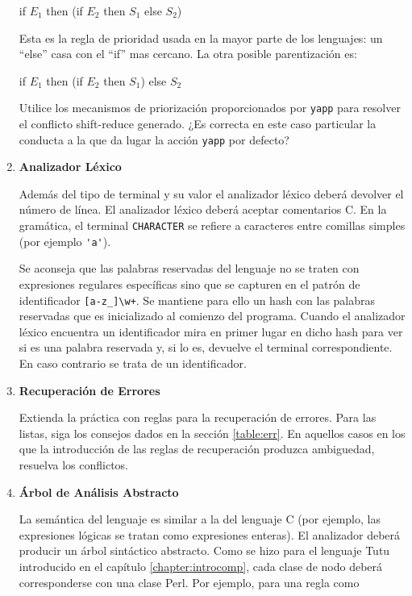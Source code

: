 \begin{enumerate}
\begin{center}
if $E_1$ then (if $E_2$ then $S_1$ else $S_2$)
\end{center}

Esta es la regla de prioridad usada en la mayor parte de los lenguajes:
un ``else'' casa con el ``if'' mas cercano. La otra posible parentización
es:

\begin{center}
if $E_1$ then (if $E_2$ then $S_1$) else $S_2$
\end{center}

Utilice los mecanismos de priorización proporcionados por \verb|yapp|
para resolver el conflicto shift-reduce generado. ¿Es correcta 
en este caso particular la conducta a la que da lugar la acción \verb|yapp|
por defecto?

\item {\bf Analizador Léxico}

Además del tipo de terminal y su valor el analizador
léxico deberá devolver el número de línea.
El analizador léxico deberá aceptar comentarios C.
En la gramática, el terminal \verb|CHARACTER| se refiere a 
caracteres entre comillas simples (por ejemplo \verb|'a'|).

Se aconseja que las palabras reservadas del lenguaje
no se traten con expresiones regulares específicas sino que se
capturen en el patrón de identificador \verb|[a-z_]\w+|. 
Se mantiene para ello un hash con las palabras reservadas 
que es inicializado al comienzo del programa. Cuando 
el analizador léxico encuentra un identificador
mira en primer lugar en dicho hash 
para ver si es una palabra reservada y,
si lo es, devuelve el terminal correspondiente.
En caso contrario se trata de un identificador.

\item {\bf Recuperación de Errores}

Extienda la práctica 
con reglas para la recuperación de errores. 
Para las listas, siga los consejos 
dados en la sección \ref{table:err}.
En aquellos casos en los que la introducción de las reglas
de recuperación produzca ambiguedad, resuelva los conflictos.

\item {\bf Árbol de Análisis Abstracto}

La semántica del lenguaje es similar a la del lenguaje C (por ejemplo,
las expresiones lógicas se tratan como expresiones enteras).
El analizador deberá producir un árbol sintáctico abstracto. Como se hizo para el
lenguaje Tutu introducido en el capítulo 
\ref{chapter:introcomp}, cada clase de nodo 
deberá corresponderse con una clase Perl. 
Por ejemplo, para una regla como 


\end{enumerate}
